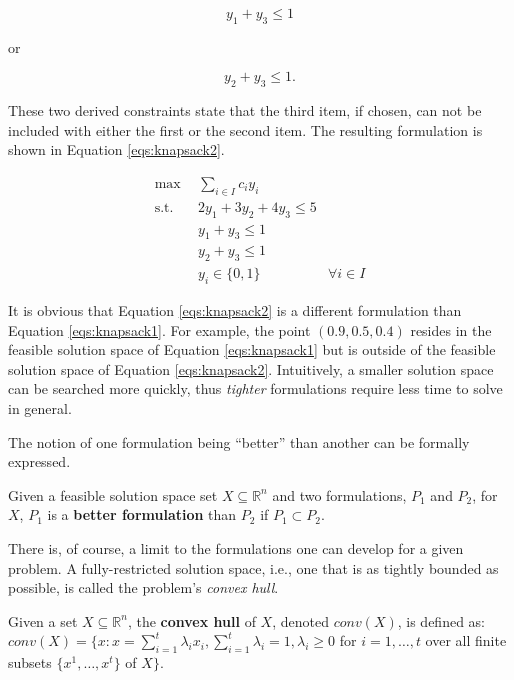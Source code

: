 \begin{equation}
y_1 + y_3 \leq 1
\end{equation}

or 

\begin{equation}
y_2 + y_3 \leq 1.
\end{equation}

These two derived constraints state that the third item, if chosen, can not be
included with either the first or the second item. The resulting formulation is
shown in Equation \ref{eqs:knapsack2}.

\begin{subequations}\label{eqs:knapsack2}
  \begin{align}
    \max \:\: & 
    \sum_{i \in I} c_i y_i
    & \\
    \text{s.t.} \:\: &
    2y_1 + 3y_2 + 4y_3 \leq 5 
    & \\
    &
    y_1 + y_3 \leq 1        
    & \\
    &
    y_2 + y_3 \leq 1        
    & \\
    &
    y_i \in \{ 0, 1 \}
    &
    \forall i \in I
  \end{align}
\end{subequations}

It is obvious that Equation \ref{eqs:knapsack2} is a different formulation than
Equation \ref{eqs:knapsack1}. For example, the point $(0.9, 0.5, 0.4)$ resides
in the feasible solution space of Equation \ref{eqs:knapsack1} but is outside of
the feasible solution space of Equation \ref{eqs:knapsack2}. Intuitively, a
smaller solution space can be searched more quickly, thus \textit{tighter}
formulations require less time to solve in general.

The notion of one formulation being ``better'' than another can be formally
expressed.

\begin{define}
Given a feasible solution space set $X \subseteq \mathbb{R}^n$ and two
formulations, $P_1$ and $P_2$, for $X$, $P_1$ is a \textbf{better formulation}
than $P_2$ if $P_1 \subset P_2$.
\end{define}

There is, of course, a limit to the formulations one can develop for a given
problem. A fully-restricted solution space, i.e., one that is as tightly bounded
as possible, is called the problem's \textit{convex hull}. 

\begin{define}
Given a set $X \subseteq \mathbb{R}^n$, the \textbf{convex hull} of $X$, denoted
$conv(X)$, is defined as: $conv(X) = \{x : x = \sum_{i=1}^{t} \lambda_i
x_i, \sum_{i=1}^{t} \lambda_i = 1, \lambda_i \geq 0$ for $i = 1, \ldots, t$ over
all finite subsets $\{x^1, \ldots, x^t \}$ of $X\}$.
\end{define}


